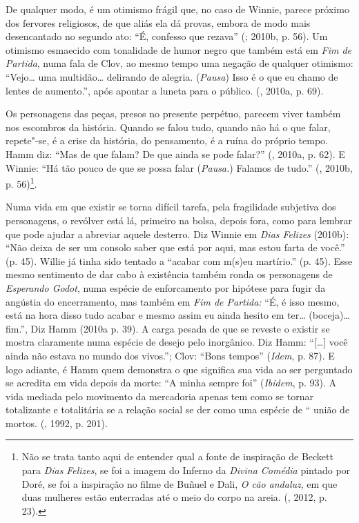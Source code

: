 De qualquer modo, é um otimismo frágil que, no caso de Winnie, parece
próximo dos fervores religiosos, de que aliás ela dá provas, embora de
modo mais desencantado no segundo ato: ``É, confesso que rezava''
(; 2010b, p. 56). Um otimismo esmaecido com tonalidade de humor
negro que também está em \emph{Fim de Partida}, numa fala de Clov, ao
mesmo tempo uma negação de qualquer otimismo: ``Vejo\ldots{} uma multidão\ldots{}
delirando de alegria. (\emph{Pausa}) Isso é o que eu chamo de lentes de
aumento.'', após apontar a luneta para o público. (, 2010a, p.
69).

Os personagens das peças, presos no presente perpétuo, parecem viver
também nos escombros da história. Quando se falou tudo, quando não há o
que falar, repete"-se, é a crise da história, do pensamento, é a ruína do
próprio tempo. Hamm diz: ``Mas de que falam? De que ainda se pode
falar?'' (, 2010a, p. 62). E Winnie: ``Há tão pouco de que se
possa falar (\emph{Pausa.}) Falamos de tudo.'' (, 2010b, p.
56)\footnote{Não se trata tanto aqui de entender qual a fonte de
  inspiração de Beckett para \emph{Dias} \emph{Felizes}, se foi a imagem
  do Inferno da \emph{Divina Comédia} pintado por Doré, se foi a
  inspiração no filme de Buñuel e Dali, \emph{O cão andaluz}, em que
  duas mulheres estão enterradas até o meio do corpo na areia.
  (, 2012, p. 23).}.

Numa vida em que existir se torna difícil tarefa, pela fragilidade
subjetiva dos personagens, o revólver está lá, primeiro na bolsa, depois
fora, como para lembrar que pode ajudar a abreviar aquele desterro. Diz
Winnie em \emph{Dias Felizes} (2010b): ``Não deixa de ser um consolo
saber que está por aqui, mas estou farta de você.'' (p. 45). Willie já
tinha sido tentado a ``acabar com m(s)eu martírio.'' (p. 45). Esse mesmo
sentimento de dar cabo à existência também ronda os personagens de
\emph{Esperando Godot}, numa espécie de enforcamento por hipótese para
fugir da angústia do encerramento, mas também em \emph{Fim de Partida:}
``É, é isso mesmo, está na hora disso tudo acabar e mesmo assim eu ainda
hesito em ter\ldots{} (boceja)\ldots{} fim.'', Diz Hamm (2010a p. 39). A carga
pesada de que se reveste o existir se mostra claramente numa espécie de
desejo pelo inorgânico. Diz Hamm: ``[\ldots{}] você ainda não estava no
mundo dos vivos.''; Clov: ``Bons tempos'' (\emph{Idem}, p. 87). E logo
adiante, é Hamm quem demonstra o que significa sua vida ao ser
perguntado se acredita em vida depois da morte: ``A minha sempre foi''
(\emph{Ibidem}, p. 93). A vida mediada pelo movimento da mercadoria
apenas tem como se tornar totalizante e totalitária se a relação social
se der como uma espécie de `` união de mortos. (, 1992, p. 201).

